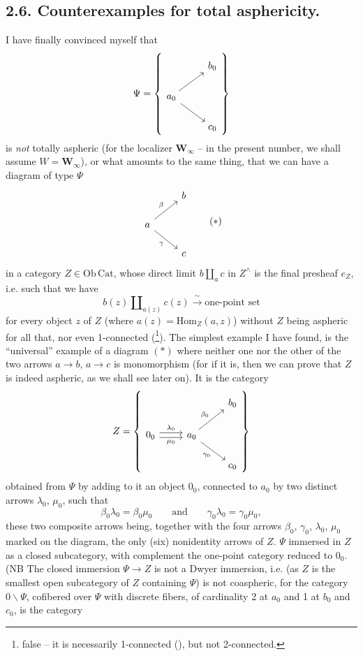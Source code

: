 \documentclass[11pt]{article}
\newcommand{\printedpage}[1]{\marginpar{\footnotesize p.~#1}}
\newcommand{\msp}[1]{\marginpar{\footnotesize [#1]}}
\newcommand{\Hom}{\mathrm{Hom}}
\newcommand{\Winf}{\mathbf{W}_{\infty}}
\begin{document}
\msp{page 10}
\subsection*{2.6. Counterexamples for total asphericity.}

I have finally convinced myself that
\[
\Psi = \left\{
\begin{tikzcd}
& b_0 \\
a_0 \arrow[ur] \arrow[dr] & \\
& c_0
\end{tikzcd}
\right\}
\]
\printedpage{7}
is \textit{not} totally aspheric (for the localizer $\Winf$ -- in the present number, we shall assume $W = \Winf$), or what amounts to the same thing, that we can have a diagram of type $\Psi$
\[
\begin{tikzcd}
& b \\
a \arrow[ur, "\beta"] \arrow[dr, "\gamma"'] & \\
& c
\end{tikzcd}
\tag*{$(*)$}
\]
in a category $Z \in \mathrm{Ob}\,\mathrm{Cat}$, whose direct limit $b \amalg_a c$ in $Z^{\wedge}$ is the final presheaf $e_Z$, i.e. such that we have
\[ b(z) \amalg_{a(z)} c(z) \xrightarrow{\ \sim\ } \text{one-point set} \]
for every object $z$ of $Z$ (where $a(z) = \Hom_Z(a,z)$) without $Z$ being aspheric for all that, nor even 1-connected (\footnote[5]{false -- it is necessarily 1-connected (\footnotemark[6]), but not 2-connected.}). The simplest example I have found, is the ``universal'' example of a diagram $(*)$ where neither one nor the other of the two arrows $a \longrightarrow b$, $a \longrightarrow c$ is monomorphism (for if it is, then we can prove that $Z$ is indeed aspheric, as we shall see later on). It is the category
\[
Z = \left\{
\begin{tikzcd}
& & b_0 \\
0_0 \arrow[r, shift left, "\lambda_0"] \arrow[r, shift right, "\mu_0"'] & a_0 \arrow[ur, "\beta_0"] \arrow[dr, "\gamma_0"'] & \\
& & c_0
\end{tikzcd}
\right\}
\]
\msp{page 11}
obtained from $\Psi$ by adding to it an object $0_0$, connected to $a_0$ by two distinct arrows $\lambda_0$, $\mu_0$, such that
\[ \beta_0\lambda_0 = \beta_0\mu_0 \qquad \text{and} \qquad \gamma_0\lambda_0 = \gamma_0\mu_0, \]
these two composite arrows being, together with the four arrows $\beta_0$, $\gamma_0$, $\lambda_0$, $\mu_0$ marked on the diagram, the only (six) nonidentity arrows of $Z$. $\Psi$ immersed in $Z$ as a closed subcategory, with complement the one-point category reduced to $0_0$. (NB The closed immersion $\Psi \longrightarrow Z$ is not a Dwyer immersion, i.e. (as $Z$ is the smallest open subcategory of $Z$ containing $\Psi$) is not coaspheric, for the category $0\backslash\Psi$, cofibered over $\Psi$ with discrete fibers, of cardinality 2 at $a_0$ and 1 at $b_0$ and $c_0$, is the category
\end{document}
